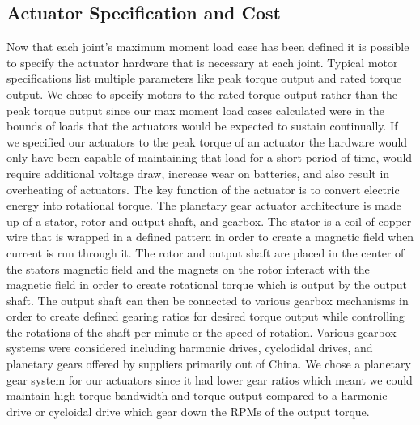 \documentclass{article}
\begin{document}
\subsection{Actuator Specification and Cost}
Now that each joint's maximum moment load case has been defined it is possible to specify the actuator hardware that is necessary at each joint. Typical motor specifications list multiple parameters like peak torque output and rated torque output. We chose to specify motors to the rated torque output rather than the peak torque output since our max moment load cases calculated were in the bounds of loads that the actuators would be expected to sustain continually. If we specified our actuators to the peak torque of an actuator the hardware would only have been capable of maintaining that load for a short period of time, would require additional voltage draw, increase wear on batteries, and also result in overheating of actuators. The key function of the actuator is to convert electric energy into rotational torque. The planetary gear actuator architecture is made up of a stator, rotor and output shaft, and gearbox. The stator is a coil of copper wire that is wrapped in a defined pattern in order to create a magnetic field when current is run through it. The rotor and output shaft are placed in the center of the stators magnetic field and the magnets on the rotor interact with the magnetic field in order to create rotational torque which is output by the output shaft. The output shaft can then be connected to various gearbox mechanisms in order to create defined gearing ratios for desired torque output while controlling the rotations of the shaft per minute or the speed of rotation. Various gearbox systems were considered including harmonic drives, cyclodidal drives, and planetary gears offered by suppliers primarily out of China. We chose a planetary gear system for our actuators since it had lower gear ratios which meant we could maintain high torque bandwidth and torque output compared to a harmonic drive or cycloidal drive which gear down the RPMs of the output torque. 
\end{document}
